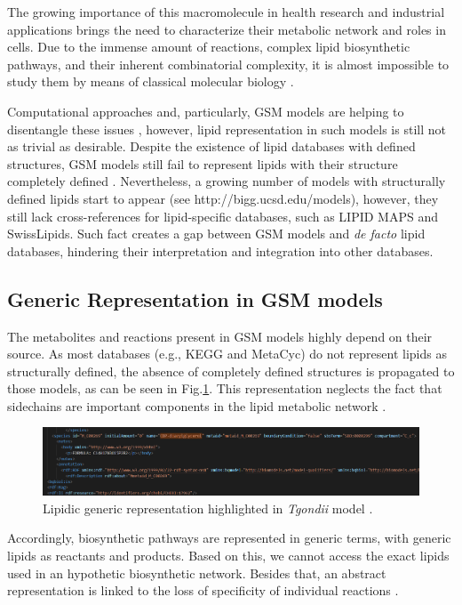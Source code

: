 \documentclass{llncs}
\begin{document}
The growing importance of this macromolecule in health research and industrial applications brings the need to characterize their metabolic network and roles in cells.
Due to the immense amount of reactions, complex lipid biosynthetic pathways, and their inherent combinatorial complexity, it is almost impossible to study them by means of classical molecular biology \cite{Schutzhold}.

Computational approaches and, particularly, GSM models are helping to disentangle these issues \cite{Schutzhold}, however, lipid representation in such models is still not as trivial as desirable.
Despite the existence of lipid databases with defined structures, GSM models still fail to represent lipids with their structure completely defined \cite{Aung2013}. Nevertheless, a growing number of models with structurally defined lipids start to appear (see http://bigg.ucsd.edu/models), however, they still lack cross-references for lipid-specific databases, such as LIPID MAPS and SwissLipids. Such fact creates a gap between GSM models and \textit{de facto} lipid databases, hindering their interpretation and integration into other databases.


\subsection{Generic Representation in GSM models}
The metabolites and reactions present in GSM models highly depend on their source. As most databases (e.g., KEGG and MetaCyc) do not represent lipids as structurally defined, the absence of completely defined structures is propagated to those models, as can be seen in Fig.\ref{fig2}. 
This representation neglects the fact that sidechains are important components in the lipid metabolic network \cite{Schutzhold,Aung2013,Sanchez2019}.

\begin{figure}
    \includegraphics[width=\textwidth]{imagens/generica.png}
    \caption{Lipidic generic representation highlighted in \textit{Tgondii} model \cite{Tymoshenko2015}.  } \label{fig2}
\end{figure}

Accordingly, biosynthetic pathways are represented in generic terms, with generic lipids as reactants and products.
Based on this, we cannot access the exact lipids used in an hypothetic biosynthetic network.
Besides that, an abstract representation is linked to the loss of specificity of individual reactions \cite{Aung2013,Capela}.
\end{document}
